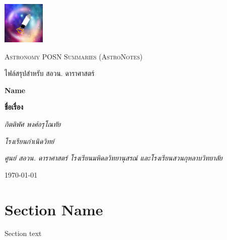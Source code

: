 \documentclass[12pt, a4paper, oneside]{article}
\begin{document}
\pagestyle{fancy}
\fancyhf{}
\cfoot{\thepage}

\begin{titlepage}
    \centering
    
    \includegraphics[width=0.15\textwidth]{img/mzpfp2.jpg}
    \par\vspace{1cm}
	{\Large \textsc{Astronomy POSN Summaries (AstroNotes)}\par}
    \vspace{0.25cm}
	{\Large \textsc{ไฟล์สรุปสำหรับ สอวน. ดาราศาสตร์}\par}

	\vspace{2cm}
	{\LARGE\bfseries Name\par}
    \vspace{0.25cm}
    {\LARGE\bfseries ชื่อเรื่อง\par}

	\vspace{1cm}
	{\Large\itshape กิตติพัศ พงศ์อรุโณทัย\par}
    \vspace{0.25cm}
    {\large\itshape โรงเรียนกำเนิดวิทย์\par}
    {\itshape ศูนย์ สอวน. ดาราศาสตร์ โรงเรียนมหิดลวิทยานุสรณ์ และโรงเรียนสวนกุหลาบวิทยาลัย}
	\vfill
	{\large \today\par}
\end{titlepage}

\section{Section Name}
Section text
\end{document}
